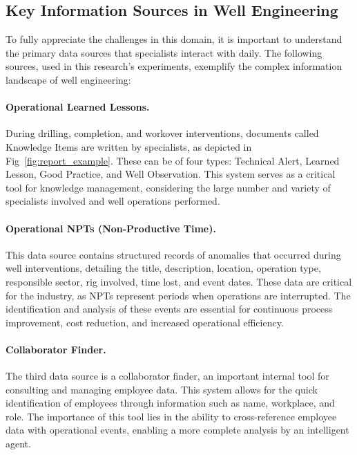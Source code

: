     \subsection{Key Information Sources in Well Engineering} \label{sec:information-sources}

        To fully appreciate the challenges in this domain, it is important to understand the primary data sources that specialists interact with daily. The following sources, used in this research's experiments, exemplify the complex information landscape of well engineering:

        \paragraph{Operational Learned Lessons.} During drilling, completion, and workover interventions, documents called Knowledge Items are written by specialists, as depicted in Fig~\ref{fig:report_example}. These can be of four types: Technical Alert, Learned Lesson, Good Practice, and Well Observation. This system serves as a critical tool for knowledge management, considering the large number and variety of specialists involved and well operations performed.

        \paragraph{Operational NPTs (Non-Productive Time).} This data source contains structured records of anomalies that occurred during well interventions, detailing the title, description, location, operation type, responsible sector, rig involved, time lost, and event dates. These data are critical for the industry, as NPTs represent periods when operations are interrupted. The identification and analysis of these events are essential for continuous process improvement, cost reduction, and increased operational efficiency.

        \paragraph{Collaborator Finder.} The third data source is a collaborator finder, an important internal tool for consulting and managing employee data. This system allows for the quick identification of employees through information such as name, workplace, and role. The importance of this tool lies in the ability to cross-reference employee data with operational events, enabling a more complete analysis by an intelligent agent.

